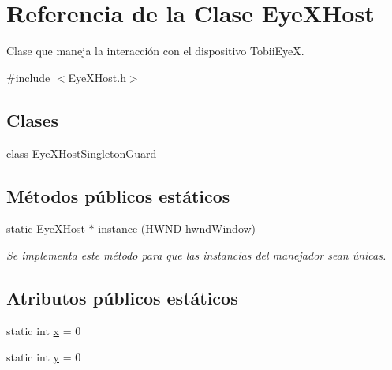 \hypertarget{class_eye_x_host}{}\section{Referencia de la Clase Eye\+X\+Host}
\label{class_eye_x_host}


Clase que maneja la interacción con el dispositivo Tobii\+Eye\+X.  




{\ttfamily \#include $<$Eye\+X\+Host.\+h$>$}

\subsection*{Clases}
\begin{DoxyCompactItemize}
\item 
class \hyperlink{class_eye_x_host_1_1_eye_x_host_singleton_guard}{Eye\+X\+Host\+Singleton\+Guard}
\end{DoxyCompactItemize}
\subsection*{Métodos públicos estáticos}
\begin{DoxyCompactItemize}
\item 
static \hyperlink{class_eye_x_host}{Eye\+X\+Host} $\ast$ \hyperlink{class_eye_x_host_a8468386a5900cfa1703844da67a713b4}{instance} (H\+W\+N\+D \hyperlink{class_eye_x_host_a9791baa4b1f20d3007d46d37e657ff43}{hwnd\+Window})
\begin{DoxyCompactList}\small\item\em Se implementa este método para que las instancias del manejador sean únicas. \end{DoxyCompactList}\end{DoxyCompactItemize}
\subsection*{Atributos públicos estáticos}
\begin{DoxyCompactItemize}
\item 
static int \hyperlink{class_eye_x_host_ab62be3731b1e28ebd84a983e6683ab34}{x} = 0
\item 
static int \hyperlink{class_eye_x_host_a35ab6bf6585bd665c4b5c50f8b577a12}{y} = 0
\end{DoxyCompactItemize}
